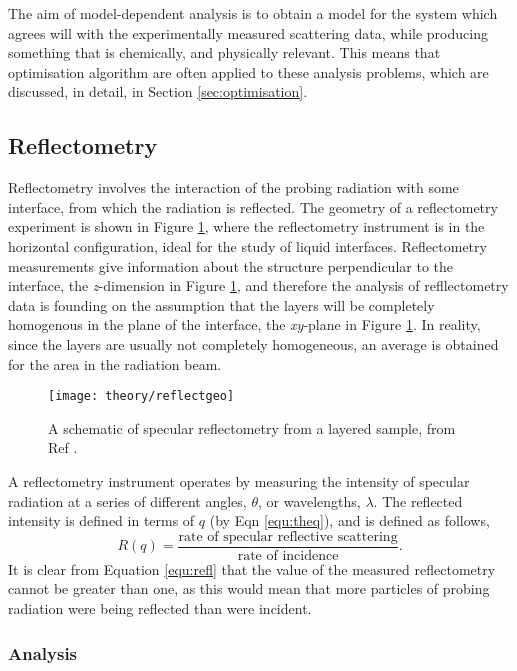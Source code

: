 The aim of model-dependent analysis is to obtain a model for the system which agrees will with the experimentally measured scattering data, while producing something that is chemically, and physically relevant. This means that optimisation algorithm are often applied to these analysis problems, which are discussed, in detail, in Section \ref{sec:optimisation}.

\subsection{Reflectometry}
Reflectometry involves the interaction of the probing radiation with some interface, from which the radiation is reflected. The geometry of a reflectometry experiment is shown in Figure \ref{fig:refgeo}, where the reflectometry instrument is in the horizontal configuration, ideal for the study of liquid interfaces. Reflectometry measurements give information about the structure perpendicular to the interface, the \emph{z}-dimension in Figure \ref{fig:refgeo}, and therefore the analysis of refllectometry data is founding on the assumption that the layers will be completely homogenous in the plane of the interface, the \emph{xy}-plane in Figure \ref{fig:refgeo}. In reality, since the layers are usually not completely homogeneous, an average is obtained for the area in the radiation beam.
%
\begin{figure}
	\centering
	\texttt{[image: theory/reflectgeo]}
	\caption{A schematic of specular reflectometry from a layered sample, from Ref \cite{Sivia2011}.}
	\label{fig:refgeo}
\end{figure}
%
A reflectometry instrument operates by measuring the intensity of specular radiation at a series of different angles, $\theta$, or wavelengths, $\lambda$. The reflected intensity is defined in terms of $q$ (by Eqn \ref{equ:theq}), and is defined as follows,
%
\begin{equation}
	R(q) = \frac{\text{rate of specular reflective scattering}}{\text{rate of incidence}}.
	\label{equ:refl}
\end{equation}
%
It is clear from Equation \ref{equ:refl} that the value of the measured reflectometry cannot be greater than one, as this would mean that more particles of probing radiation were being reflected than were incident.

\subsubsection{Analysis}

